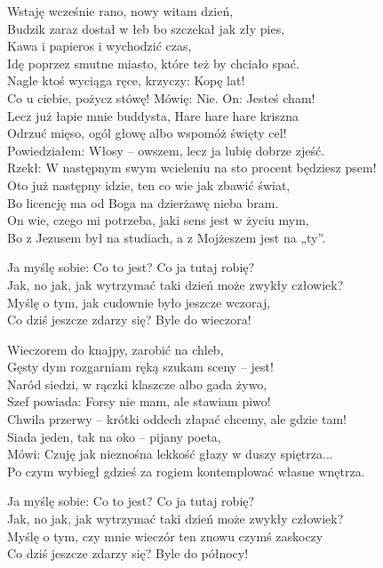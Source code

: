 \begin{text}
\footnotesize{
Wstaję wcześnie rano, nowy witam dzień,\\
Budzik zaraz dostał w łeb bo szczekał jak zły pies,\\
Kawa i papieros i wychodzić czas,\\
Idę poprzez smutne miasto, które też by chciało spać.\\
Nagle ktoś wyciąga ręce, krzyczy: Kopę lat!\\
Co u ciebie, pożycz stówę! Mówię: Nie. On: Jesteś cham!\\
Lecz już łapie mnie buddysta, Hare hare hare kriszna\\
Odrzuć mięso, ogól głowę albo wspomóż święty cel!\\
Powiedziałem: Włosy – owszem, lecz ja lubię dobrze zjeść.\\
Rzekł: W następnym swym wcieleniu na sto procent będziesz psem!\\
Oto już następny idzie, ten co wie jak zbawić świat,\\
Bo licencję ma od Boga na dzierżawę nieba bram.\\
On wie, czego mi potrzeba, jaki sens jest w życiu mym,\\
Bo z Jezusem był na studiach, a z Mojżeszem jest na „ty”.

Ja myślę sobie: Co to jest? Co ja tutaj robię?\\
Jak, no jak, jak wytrzymać taki dzień może zwykły człowiek?\\
Myślę o tym, jak cudownie było jeszcze wczoraj,\\
Co dziś jeszcze zdarzy się? Byle do wieczora!

Wieczorem do knajpy, zarobić na chleb,\\
Gęsty dym rozgarniam ręką szukam sceny – jest!\\
Naród siedzi, w rączki klaszcze albo gada żywo,\\
Szef powiada: Forsy nie mam, ale stawiam piwo!\\
Chwila przerwy – krótki oddech złapać chcemy, ale gdzie tam!\\
Siada jeden, tak na oko – pijany poeta,\\
Mówi: Czuję jak nieznośna lekkość głazy w duszy spiętrza...\\
Po czym wybiegł gdzieś za rogiem kontemplować własne wnętrza.

Ja myślę sobie: Co to jest? Co ja tutaj robię?\\
Jak, no jak, jak wytrzymać taki dzień może zwykły człowiek?\\
Myślę o tym, czy mnie wieczór ten znowu czymś zaskoczy\\
Co dziś jeszcze zdarzy się? Byle do północy!

}
\end{text}
